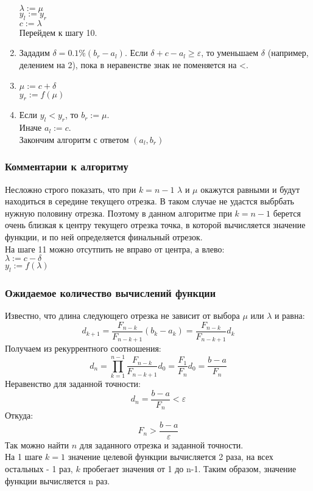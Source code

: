 \begin{enumerate}
	$\lambda:=\mu$\\
	$y_l:=y_r$\\
	$c:=\lambda$\\
	Перейдем к шагу 10.
	\item Зададим $\delta=0.1\%(b_r-a_l)$. Если $\delta + c - a_l\geq\varepsilon$, то уменьшаем $\delta$ (например, делением на 2), пока в неравенстве знак не поменяется на <.
	\item $\mu:=c+\delta$\\
	$y_r:=f(\mu)$
	\item Если $y_l < y_r$, то $b_r :=\mu$.\\
	Иначе $a_l:=c$.\\
	Закончим алгоритм с ответом $(a_l, b_r)$
\end{enumerate}

\subsubsection{Комментарии к алгоритму}
Несложно строго показать, что при $k=n-1$ $\lambda$ и $\mu$ окажутся равными и будут находиться в середине текущего отрезка. В таком случае не удастся выбрбать нужную половину отрезка. Поэтому в данном алгоритме при $k=n-1$ берется очень близкая к центру текущего отрезка точка, в которой вычисляется значение функции, и по ней определяется финальный отрезок.\\
На шаге 11 можно отсутпить не вправо от центра, а влево:\\
$\lambda:=c-\delta$\\
$y_l:=f(\lambda)$

\subsubsection{Ожидаемое количество вычислений функции}
Известно, что длина следующего отрезка не зависит от выбора $\mu$ или $\lambda$ и равна:\\
\begin{equation}
d_{k+1}=\frac{F_{n-k}}{F_{n-k+1}}(b_k-a_k)=\frac{F_{n-k}}{F_{n-k+1}}d_k
\end{equation}
Получаем из рекуррентного соотношения:\\
\begin{equation}
d_{n}=\prod_{k=1}^{n-1}\frac{F_{n-k}}{F_{n-k+1}}d_0=\frac{F_{1}}{F_{n}}d_0=\frac{b-a}{F_{n}}
\end{equation}
Неравенство для заданной точности:\\
\begin{equation}
d_{n}=\frac{b-a}{F_{n}}<\varepsilon
\end{equation}
Откуда:\\
\begin{equation}\label{fib}
F_n>\frac{b-a}{\varepsilon}
\end{equation}
Так можно найти $n$ для заданного отрезка и заданной точности.\\
На 1 шаге $k=1$ значение целевой функции вычисляется 2 раза, на всех остальных - 1 раз, $k$ пробегает значения от 1 до n-1. Таким образом, значение функции вычисляется n раз.

